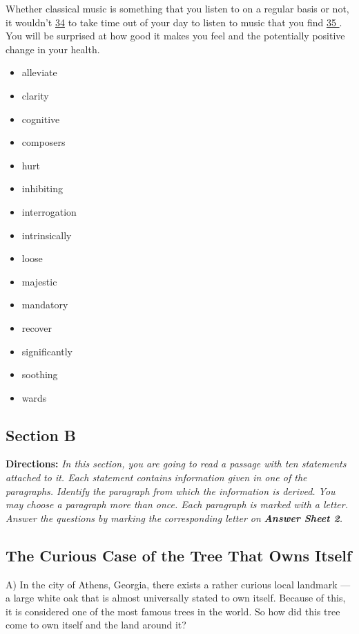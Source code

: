 \documentclass[UTF8,11pt]{ctexart}
\begin{document}
Whether classical music is something that you listen to on a regular basis or not, it wouldn’t \uline{34} to take time out of your day to listen to music that you find \uline{35 }. You will be surprised at how good it makes you feel and the potentially positive change in your health.


\begin{itemize}[leftmargin=2em,itemsep=.2em,topsep=.4em]\item[A.] alleviate
\item[B.] clarity
\item[C.] cognitive
\item[D.] composers
\item[E.] hurt
\item[F.] inhibiting
\item[G.] interrogation
\item[H.] intrinsically
\item[I.] loose
\item[J.] majestic
\item[K.] mandatory
\item[L.] recover
\item[M.] significantly
\item[N.] soothing
\item[O.] wards
\end{itemize}

\subsection*{\textbf{Section B}}


\textbf{Directions:} \textit{In this section, you are going to read a passage with ten statements attached to it. Each statement contains} \textit{information given in one of the paragraphs. Identify the paragraph from which the information is derived. You may} \textit{choose a paragraph more than once. Each paragraph is marked with a letter. Answer the questions by marking the} \textit{corresponding letter on }\textbf{\textit{Answer Sheet 2}}\textit{.}


\subsection*{\textbf{The Curious Case of the Tree That Owns Itself}}


A) In the city of Athens, Georgia, there exists a rather curious local landmark — a large white oak that is almost universally stated to own itself. Because of this, it is considered one of the most famous trees in the world. So how did this tree come to own itself and the land around it?
\end{document}
